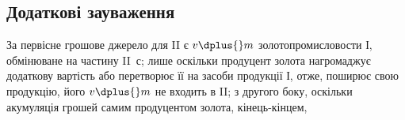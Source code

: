 \subsection{Додаткові зауваження}

За первісне грошове джерело для II є $v \dplus{} m$ золотопромисловости І,
обмінюване на частину II~$с$; лише оскільки продуцент золота нагромаджує
додаткову вартість або перетворює її на засоби продукції І, отже,
поширює свою продукцію, його $v \dplus{} m$ не входить в II; з другого боку,
оскільки акумуляція грошей самим продуцентом золота, кінець-кінцем,
\parbreak{}  %
